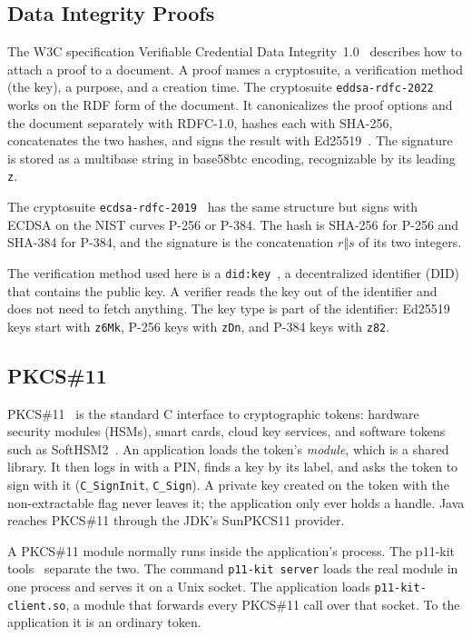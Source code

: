 \documentclass[11pt,a4paper]{article}
\newcommand{\code}[1]{\texttt{#1}}
\begin{document}
\subsection{Data Integrity Proofs}
\label{sec:di}

The W3C specification Verifiable Credential Data Integrity~1.0~\cite{vcdi} describes how to attach
a proof to a document. A proof names a cryptosuite, a verification method (the key), a
purpose, and a creation time. The cryptosuite \code{eddsa-rdfc-2022}~\cite{eddsa} works on
the RDF form of the document. It canonicalizes the proof options and the document separately
with RDFC-1.0, hashes each with SHA-256, concatenates the two hashes, and signs the result with
Ed25519~\cite{rfc8032}. The signature is stored as a multibase string in base58btc encoding,
recognizable by its leading \code{z}.

The cryptosuite \code{ecdsa-rdfc-2019}~\cite{ecdsa} has the same structure but signs with
ECDSA on the NIST curves P-256 or P-384. The hash is SHA-256 for P-256 and SHA-384 for
P-384, and the signature is the concatenation $r \Vert s$ of its two integers.

The verification method used here is a \code{did:key}~\cite{didkey}, a decentralized identifier
(DID) that contains the public key. A verifier reads the key out of the identifier and
does not need to fetch anything. The key type is part of the identifier: Ed25519 keys start with
\code{z6Mk}, P-256 keys with \code{zDn}, and P-384 keys with \code{z82}.

\subsection{PKCS\#11}
\label{sec:pkcs11}

PKCS\#11~\cite{pkcs11} is the standard C interface to cryptographic tokens: hardware security
modules (HSMs), smart cards, cloud key services, and software tokens such as
SoftHSM2~\cite{softhsm}. An application loads the token's \emph{module}, which is a shared
library. It then logs in with a PIN, finds a key by its label, and asks the token to sign with it
(\code{C\_SignInit}, \code{C\_Sign}). A private key created on the token with the
non-extractable flag never leaves it; the application only ever holds a handle. Java reaches
PKCS\#11 through the JDK's SunPKCS11 provider.

A PKCS\#11 module normally runs inside the application's process. The p11-kit
tools~\cite{p11kit} separate the two. The command \code{p11-kit server} loads the real module
in one process and serves it on a Unix socket. The application loads \code{p11-kit-client.so}, a module that forwards every
PKCS\#11 call over that socket. To the application it is an ordinary token.
\end{document}
